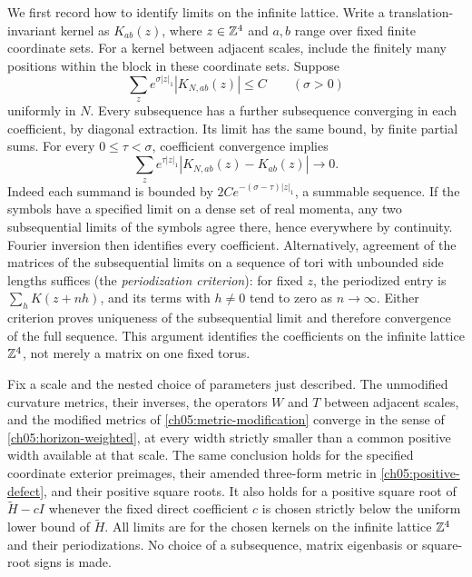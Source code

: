 We first record how to identify limits on the infinite lattice. Write a
translation-invariant kernel as $K_{ab}(z)$, where $z\in\mathbb Z^4$ and $a,b$
range over fixed finite coordinate sets. For a kernel between adjacent scales,
include the finitely many positions within the block in these coordinate sets. Suppose
\[
 \sum_z e^{\sigma|z|_1}|K_{N,ab}(z)|\le C
 \qquad(\sigma>0)
\]
uniformly in $N$. Every subsequence has a further subsequence converging
in each coefficient, by diagonal extraction. Its limit has the same
bound, by finite partial sums. For every $0\le\tau<\sigma$, coefficient
convergence implies
\begin{equation}
 \sum_z e^{\tau|z|_1}|K_{N,ab}(z)-K_{ab}(z)|\longrightarrow0.
 \label{ch05:horizon-weighted}
\end{equation}
Indeed each summand is bounded by
$2C e^{-(\sigma-\tau)|z|_1}$, a summable sequence. If the symbols have
a specified limit on a dense set of real momenta, any two subsequential limits of the
symbols agree there, hence everywhere by continuity. Fourier inversion
then identifies every coefficient. Alternatively, agreement of the matrices of the subsequential
limits on a sequence of tori with unbounded side lengths suffices (the \emph{periodization criterion}): for fixed $z$,
the periodized entry is $\sum_h K(z+nh)$, and its terms with $h\ne0$
tend to zero as $n\to\infty$. Either criterion proves uniqueness of
the subsequential limit and therefore convergence of the full sequence.
This argument identifies the coefficients on the infinite lattice $\mathbb Z^4$, not merely a
matrix on one fixed torus.

\begin{proposition}
\label{ch05:horizon-limit}
Fix a scale and the nested choice of parameters just described. The unmodified
curvature metrics, their inverses, the operators $W$ and $T$ between adjacent
scales, and the modified metrics of
\eqref{ch05:metric-modification} converge in the sense of
\eqref{ch05:horizon-weighted}, at every width strictly smaller than a
common positive width available at that scale. The same conclusion
holds for the specified coordinate exterior preimages, their amended
three-form metric in \eqref{ch05:positive-defect}, and their positive
square roots. It also holds for a positive square root of
$\widetilde H-cI$ whenever the fixed direct coefficient $c$ is chosen
strictly below the uniform lower bound of $\widetilde H$.
All limits are for the chosen kernels on the infinite lattice $\mathbb Z^4$ and their
periodizations. No choice of a subsequence, matrix eigenbasis or
square-root signs is made.
\end{proposition}

